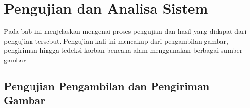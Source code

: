 \chapter{Pengujian dan Analisa Sistem}

\ifpdf
    \graphicspath{{Chapter4/Figs/tinggi/}{Chapter4/Figs/idv/}{Chapter4/Figs/}}
\else
    \graphicspath{{Chapter4/Figs/Vector/}{Chapter4/Figs/}}
\fi

Pada bab ini menjelaskan mengenai proses pengujian dan hasil yang didapat dari pengujian tersebut. Pengujian kali ini mencakup dari pengambilan gambar, pengiriman hingga tedeksi korban bencana alam menggunakan berbagai sumber gambar.

\section{Pengujian Pengambilan dan Pengiriman Gambar}

